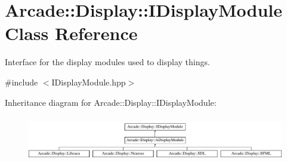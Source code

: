 \hypertarget{classArcade_1_1Display_1_1IDisplayModule}{}\section{Arcade\+::Display\+::I\+Display\+Module Class Reference}
\label{classArcade_1_1Display_1_1IDisplayModule}


Interface for the display modules used to display things.  




{\ttfamily \#include $<$I\+Display\+Module.\+hpp$>$}

Inheritance diagram for Arcade\+::Display\+::I\+Display\+Module\+:\begin{figure}[H]
\begin{center}
\leavevmode
\includegraphics[height=2.009569cm]{classArcade_1_1Display_1_1IDisplayModule}
\end{center}
\end{figure}
